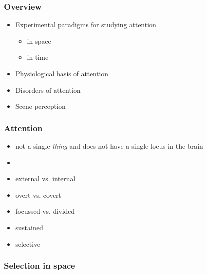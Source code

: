 \documentclass[]{beamer}
\begin{document}
\begin{frame}
 \frametitle{Overview}
\begin{itemize}[<+->]
  \setlength{\itemsep}{5pt}
 \item Experimental paradigms for studying attention
 \begin{itemize}
  \item in space
  \item in time
 \end{itemize}
 \item Physiological basis of attention
 \item Disorders of attention
 \item Scene perception
\end{itemize}
\end{frame}

\begin{frame}
\frametitle{Attention}
\begin{overlayarea}{110mm}{80mm}
\begin{itemize}
 \item<1-> not a single \textit{thing} and does not have a single locus in the brain
 \item[]
 \item<2-> external vs. internal
 \item<3-> overt vs. covert
 \item<4-> focussed vs. divided
 \item<5-> sustained
 \item<6-> selective
\end{itemize}
\end{overlayarea}
\end{frame}


\begin{frame}
 \frametitle{Selection in space}
\begin{overlayarea}{130mm}{75mm}

\end{overlayarea}
\end{frame}
\end{document}

